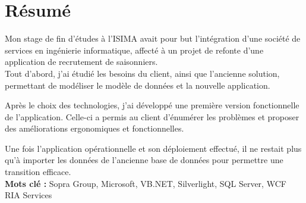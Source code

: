 \cleardoublepage

\chapter*{Résumé}

\thispagestyle{empty}



Mon stage de fin d'études à l'ISIMA avait pour but l'intégration d'une société de services en ingénierie informatique, affecté à un projet de refonte d'une application de recrutement de saisonniers.
\\

Tout d'abord, j'ai étudié les besoins du client, ainsi que l'ancienne solution, permettant de modéliser le modèle de données et la nouvelle application.

Après le choix des technologies, j'ai développé une première version fonctionnelle de l'application.
Celle-ci a permis au client d'énumérer les problèmes et proposer des améliorations ergonomiques et fonctionnelles.

Une fois l'application opérationnelle et son déploiement effectué, il ne restait plus qu'à importer les données de l'ancienne base de données pour permettre une transition efficace.
\\

\textbf{Mots clé : } Sopra Group, Microsoft, VB.NET, Silverlight, SQL Server, WCF RIA Services